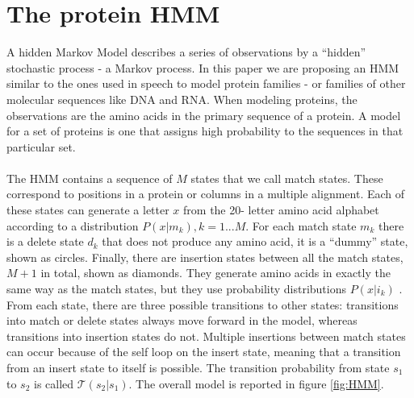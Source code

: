 \section{The protein HMM}
A hidden Markov Model describes a series of observations by a “hidden” stochastic process - a Markov process.
In this paper we are proposing an HMM similar to the ones used in speech to model protein families - or families of other molecular sequences like DNA and RNA. When modeling proteins, the observations are the amino acids in the primary sequence of a protein. A model for a set of proteins is one that assigns high probability to the sequences in that particular set. 
\\
\\
\noindent
The HMM contains a sequence of $M$ states that we call match states. These correspond to positions in a protein or columns in a multiple alignment. Each of these states can generate a letter $x$ from the 20- letter amino acid alphabet according to a distribution $P(x|m_k), k= 1...M$.  For each match state $m_k$ there is a delete state $d_k$ that does not produce any amino acid, it is a “dummy” state, shown as circles. Finally, there are insertion states between all the match states, $M + 1$ in total, shown as diamonds. They generate amino acids in exactly the same way as the match states, but they use probability distributions $P ( x | i_k )$ .
From each state, there are three possible transitions to other states: transitions into match or delete states always move forward in the model, whereas transitions into insertion states do not. Multiple insertions between match states can occur because of the self loop on the insert state, meaning that a transition from an insert state to itself is possible. The transition probability from state $s_1$ to $s_2$ is called $\mathcal{T}(s_2|s_1)$. 
The overall model is reported in figure \ref{fig:HMM}.

